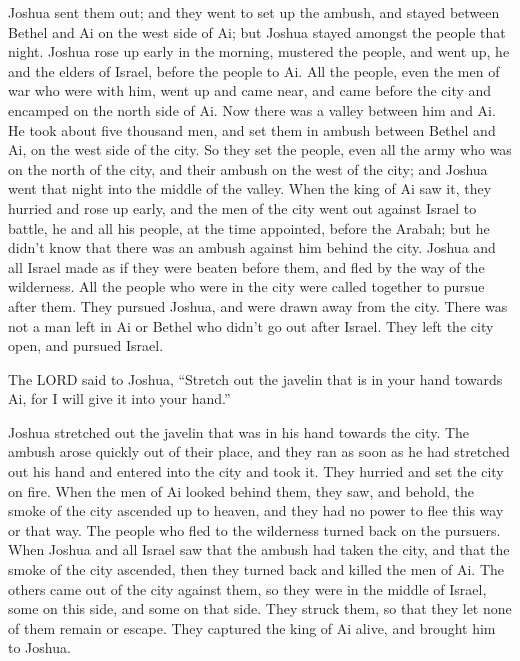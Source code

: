  Joshua sent them out; and they went to set up the ambush,
and stayed between Bethel and Ai on the west side of Ai; but Joshua
stayed amongst the people that night.  Joshua rose up early
in the morning, mustered the people, and went up, he and the elders of
Israel, before the people to Ai.  All the people, even the
men of war who were with him, went up and came near, and came before the
city and encamped on the north side of Ai. Now there was a valley
between him and Ai.  He took about five thousand men, and
set them in ambush between Bethel and Ai, on the west side of the city.
 So they set the people, even all the army who was on the
north of the city, and their ambush on the west of the city; and Joshua
went that night into the middle of the valley.  When the
king of Ai saw it, they hurried and rose up early, and the men of the
city went out against Israel to battle, he and all his people, at the
time appointed, before the Arabah; but he didn't know that there was an
ambush against him behind the city.  Joshua and all Israel
made as if they were beaten before them, and fled by the way of the
wilderness.  All the people who were in the city were
called together to pursue after them. They pursued Joshua, and were
drawn away from the city.  There was not a man left in Ai
or Bethel who didn't go out after Israel. They left the city open, and
pursued Israel.

 The LORD said to Joshua, ``Stretch out the javelin that is
in your hand towards Ai, for I will give it into your hand.''

Joshua stretched out the javelin that was in his hand towards the city.
 The ambush arose quickly out of their place, and they ran
as soon as he had stretched out his hand and entered into the city and
took it. They hurried and set the city on fire.  When the
men of Ai looked behind them, they saw, and behold, the smoke of the
city ascended up to heaven, and they had no power to flee this way or
that way. The people who fled to the wilderness turned back on the
pursuers.  When Joshua and all Israel saw that the ambush
had taken the city, and that the smoke of the city ascended, then they
turned back and killed the men of Ai.  The others came out
of the city against them, so they were in the middle of Israel, some on
this side, and some on that side. They struck them, so that they let
none of them remain or escape.  They captured the king of
Ai alive, and brought him to Joshua.

